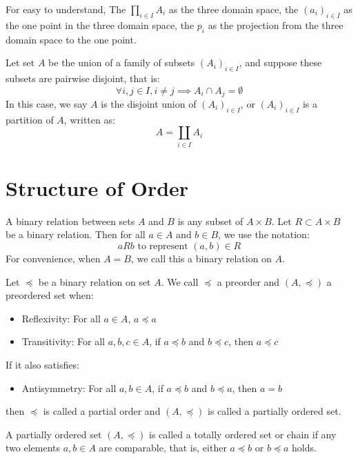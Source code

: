 \documentclass[11pt,lang=en]{elegantbook}
\begin{document}
\begin{remark}
  For easy to understand, The $\prod_{i \in I} A_i$ as the three domain space, the $(a_i)_{i\in I}$ as the one point in the three domain space, the $p_i$ as the projection from the three domain space to the one point.
\end{remark}

\begin{definition}
  Let set $A$ be the union of a family of subsets $(A_i)_{i \in I}$, and suppose these subsets are pairwise disjoint, that is:
  \[
    \forall i,j \in I, i \neq j \implies A_i \cap A_j = \emptyset
  \]
  In this case, we say $A$ is the disjoint union of $(A_i)_{i \in I}$, or $(A_i)_{i \in I}$ is a partition of $A$, written as:
  \[
    A = \coprod_{i \in I} A_i
  \]
\end{definition}

\section{Structure of Order}

\begin{definition}
  A binary relation between sets $A$ and $B$ is any subset of $A \times B$. Let $R \subset A \times B$ be a binary relation. Then for all $a \in A$ and $b \in B$, we use the notation:
  \[
    aRb \text{ to represent } (a,b) \in R
  \]
  For convenience, when $A = B$, we call this a binary relation on $A$.
\end{definition}

\begin{definition}
  Let $\preceq$ be a binary relation on set $A$. We call $\preceq$ a preorder and $(A,\preceq)$ a preordered set when:
  \begin{itemize}
    \item Reflexivity: For all $a \in A$, $a \preceq a$
    \item Transitivity: For all $a,b,c \in A$, if $a \preceq b$ and $b \preceq c$, then $a \preceq c$
  \end{itemize}

  If it also satisfies:
  \begin{itemize}
    \item Antisymmetry: For all $a,b \in A$, if $a \preceq b$ and $b \preceq a$, then $a = b$
  \end{itemize}
  then $\preceq$ is called a partial order and $(A,\preceq)$ is called a partially ordered set.

  A partially ordered set $(A,\preceq)$ is called a totally ordered set or chain if any two elements $a,b \in A$ are comparable, that is, either $a \preceq b$ or $b \preceq a$ holds.
\end{definition}
\end{document}
